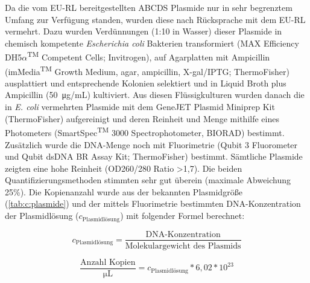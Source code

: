Da die vom EU-RL bereitgestellten ABCDS Plasmide nur in sehr begrenztem Umfang zur Verfügung standen, wurden diese nach Rücksprache mit dem EU-RL vermehrt. Dazu wurden Verdünnungen (1:10 in Wasser) dieser Plasmide in chemisch kompetente \textit{Escherichia coli} Bakterien transformiert (MAX Efficiency\textsuperscript{\textregistered}
 DH5$\alpha$\textsuperscript{TM} Competent Cells; Invitrogen), auf Agarplatten mit Ampicillin (imMedia\textsuperscript{TM} Growth Medium, agar, ampicillin, X-gal/IPTG; ThermoFisher) ausplattiert und entsprechende Kolonien selektiert und in Liquid Broth plus Ampicillin (\SI{50}{\micro\gram}/\si{\milli\liter}) kultiviert. Aus diesen Flüssigkulturen wurden danach die in \textit{E. coli} vermehrten Plasmide mit dem GeneJET Plasmid Miniprep Kit (ThermoFisher) aufgereinigt und deren Reinheit und Menge mithilfe eines Photometers (SmartSpec\textsuperscript{TM} 3000 Spectrophotometer, BIORAD) bestimmt. Zusätzlich wurde die DNA-Menge noch mit Fluorimetrie (Qubit 3 Fluorometer und Qubit dsDNA BR Assay Kit; ThermoFisher) bestimmt. Sämtliche Plasmide zeigten eine hohe Reinheit (OD260/280 Ratio >1,7). Die beiden Quantifizierungsmethoden stimmten sehr gut überein (maximale Abweichung 25\%). Die Kopienanzahl wurde aus der bekannten Plasmidgröße (\cref{tab:c:plasmide}) und der mittels Fluorimetrie bestimmten DNA-Konzentration der Plasmidlösung ($c_{\text{Plasmidlösung}}$) mit folgender Formel berechnet:

\begin{equation}
    c_{\text{Plasmidlösung}} = \frac{\text{DNA-Konzentration}}{\text{Molekulargewicht des Plasmids}}
\end{equation}

\begin{equation}
    \frac{\text{Anzahl Kopien}}{\si{\micro\liter}} = c_{\text{Plasmidlösung}}*6,02*10^{23}
\end{equation}

